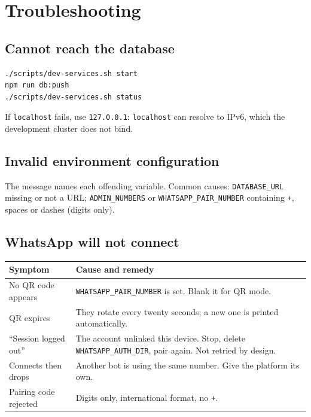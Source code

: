 \documentclass[11pt,a4paper]{report}
\begin{document}
\chapter{Troubleshooting}

\section*{Cannot reach the database}

\begin{lstlisting}[language=bash]
./scripts/dev-services.sh start
npm run db:push
./scripts/dev-services.sh status
\end{lstlisting}

If \texttt{localhost} fails, use \texttt{127.0.0.1}: \texttt{localhost} can
resolve to IPv6, which the development cluster does not bind.

\section*{Invalid environment configuration}

The message names each offending variable. Common causes: \texttt{DATABASE\_URL}
missing or not a URL; \texttt{ADMIN\_NUMBERS} or
\texttt{WHATSAPP\_PAIR\_NUMBER} containing \texttt{+}, spaces or dashes
(digits only).

\section*{WhatsApp will not connect}

\begin{center}
\begin{tabularx}{\textwidth}{@{}lX@{}}
\toprule
\textbf{Symptom} & \textbf{Cause and remedy} \\
\midrule
No QR code appears & \texttt{WHATSAPP\_PAIR\_NUMBER} is set. Blank it for QR
mode. \\
QR expires & They rotate every twenty seconds; a new one is printed
automatically. \\
``Session logged out'' & The account unlinked this device. Stop, delete
\texttt{WHATSAPP\_AUTH\_DIR}, pair again. Not retried by design. \\
Connects then drops & Another bot is using the same number. Give the platform
its own. \\
Pairing code rejected & Digits only, international format, no \texttt{+}. \\
\bottomrule
\end{tabularx}
\end{center}
\end{document}
